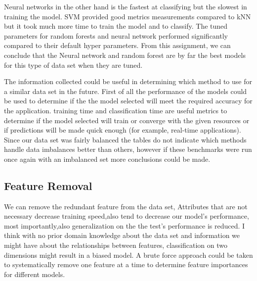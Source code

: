 Neural networks in the other hand is the fastest at classifying but the slowest in training the model. SVM provided good metrics measurements compared to kNN but it took much more time to train the model and to classify. The tuned parameters for random forests and neural network performed significantly compared to their default hyper parameters. From this assignment, we can conclude that the Neural network and random forest are by far the best models for this type of data set when they are tuned. 

The information collected could be useful in determining which method to use for a similar data set in the future. First of all the performance of the models could be used to determine if the the model selected will meet the required accuracy for the application. training time and classification time are useful metrics to determine if the model selected will train or converge with the given resources or if predictions will be made quick enough (for example, real-time applications). Since our data set was fairly balanced the tables do not indicate which methods handle data imbalances better than others, however if these benchmarks were run once again with an imbalanced set more conclusions could be made.



\subsection{Feature Removal}
We can remove the redundant feature from the data set, Attributes that are not necessary decrease training speed,also tend to decrease our model's performance, most importantly,also generalization on the the test's performance is reduced.
I think with no prior domain knowledge about the data set and information we might have about the relationships between features, classification on two dimensions might result in a biased model. A brute force approach could be taken to systematically remove one feature at a time to determine feature importances for different models. 